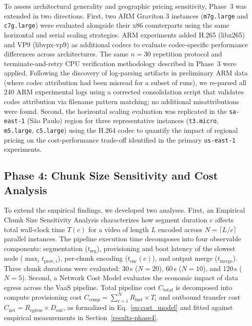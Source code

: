 \documentclass[conference]{IEEEtran}
\begin{document}
To assess architectural generality and geographic pricing sensitivity, Phase~3 was extended in two directions. First, two ARM Graviton 3 instances (\texttt{m7g.large} and \texttt{c7g.large}) were evaluated alongside their x86 counterparts using the same horizontal and serial scaling strategies. ARM experiments added H.265 (libx265) and VP9 (libvpx-vp9) as additional codecs to evaluate codec-specific performance differences across architectures. The same $n=30$ repetition protocol and terminate-and-retry CPU verification methodology described in Phase~3 were applied. Following the discovery of log-parsing artifacts in preliminary ARM data (where codec attribution had been misread for a subset of runs), we re-parsed all 240 ARM experimental logs using a corrected consolidation script that validates codec attribution via filename pattern matching; no additional misattributions were found. Second, the horizontal scaling evaluation was replicated in the \texttt{sa-east-1} (São Paulo) region for three representative instances (\texttt{t3.micro}, \texttt{m5.large}, \texttt{c5.large}) using the H.264 codec to quantify the impact of regional pricing on the cost-performance trade-off identified in the primary \texttt{us-east-1} experiments.

\subsection{Phase 4: Chunk Size Sensitivity and Cost Analysis}

To extend the empirical findings, we developed two analyses. First, an Empirical Chunk Size Sensitivity Analysis characterizes how segment duration $c$ affects total wall-clock time $T(c)$ for a video of length $L$ encoded across $N = \lceil L/c \rceil$ parallel instances. The pipeline execution time decomposes into four observable components: segmentation ($t_{\text{seg}}$), provisioning and boot latency of the slowest node ($\max_i t_{\text{prov},i}$), per-chunk encoding ($t_{\text{enc}}(c)$), and output merge ($t_{\text{merge}}$). Three chunk durations were evaluated: 30\,s ($N=20$), 60\,s ($N=10$), and 120\,s ($N=5$). Second, a Network Cost Model evaluates the economic impact of data egress across the VaaS pipeline. Total pipeline cost $C_{\text{total}}$ is decomposed into compute provisioning cost $C_{\text{comp}} = \sum_{i=1}^{N} R_{\text{inst}} \times T_i$ and outbound transfer cost $C_{\text{net}} = R_{\text{egress}} \times D_{\text{out}}$, as formalized in Eq.~\ref{eq:cost_model} and fitted against empirical measurements in Section~\ref{results-phase4}.
\end{document}
